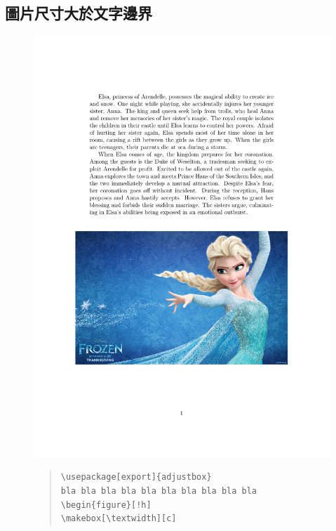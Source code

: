 \documentclass[12pt,a4paper]{report}
\begin{document}
\begin{CJK}{UTF8}{bkai}
\section{圖片尺寸大於文字邊界}
\vspace{-1cm}
\begin{figure}[!h] 
\begin{minipage}[b]{0.5\textwidth} 
\centering 
\includegraphics[scale=0.3]{./pics/figure_over_boundary_example.pdf} 
\end{minipage}%
\begin{minipage}[b]{0.5\textwidth} 
\begin{footnotesize}
\begin{quote}
\begin{verbatim}
\usepackage[export]{adjustbox}
bla bla bla bla bla bla bla bla bla bla
\begin{figure}[!h]
\makebox[\textwidth][c]

\end{verbatim}
\end{quote}
\end{footnotesize}
\end{minipage}
\end{figure}
\end{CJK}
\end{document}
